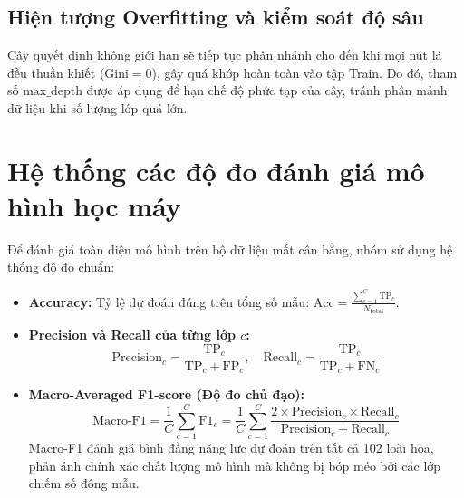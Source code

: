 \documentclass[../DoAn.tex]{subfiles}
\begin{document}
\subsection{Hiện tượng Overfitting và kiểm soát độ sâu}
Cây quyết định không giới hạn sẽ tiếp tục phân nhánh cho đến khi mọi nút lá đều thuần khiết ($\text{Gini} = 0$), gây quá khớp hoàn toàn vào tập Train. Do đó, tham số $\text{max\_depth}$ được áp dụng để hạn chế độ phức tạp của cây, tránh phân mảnh dữ liệu khi số lượng lớp quá lớn.

\section{Hệ thống các độ đo đánh giá mô hình học máy}
Để đánh giá toàn diện mô hình trên bộ dữ liệu mất cân bằng, nhóm sử dụng hệ thống độ đo chuẩn:
\begin{itemize}
    \item \textbf{Accuracy:} Tỷ lệ dự đoán đúng trên tổng số mẫu: $\text{Acc} = \frac{\sum_{c=1}^C \text{TP}_c}{N_{\text{total}}}$.
    \item \textbf{Precision và Recall của từng lớp $c$:}
    \begin{equation}
        \text{Precision}_c = \frac{\text{TP}_c}{\text{TP}_c + \text{FP}_c}, \quad \text{Recall}_c = \frac{\text{TP}_c}{\text{TP}_c + \text{FN}_c}
    \end{equation}
    \item \textbf{Macro-Averaged F1-score (Độ đo chủ đạo):}
    \begin{equation}
        \text{Macro-F1} = \frac{1}{C} \sum_{c=1}^C \text{F1}_c = \frac{1}{C} \sum_{c=1}^C \frac{2 \times \text{Precision}_c \times \text{Recall}_c}{\text{Precision}_c + \text{Recall}_c}
    \end{equation}
    Macro-F1 đánh giá bình đẳng năng lực dự đoán trên tất cả 102 loài hoa, phản ánh chính xác chất lượng mô hình mà không bị bóp méo bởi các lớp chiếm số đông mẫu.
\end{itemize}
\end{document}
